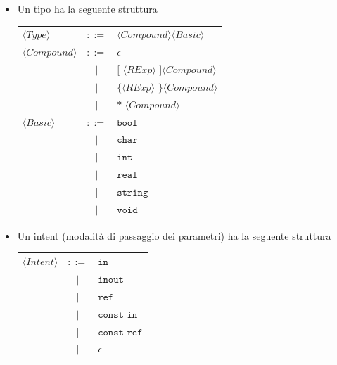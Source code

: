 \documentclass{report}
\newcommand{\nonterm}[1]{\langle #1 \rangle}
\newcommand{\term}[1]{\texttt{#1}}
\begin{document}
\begin{itemize}
    \item Un tipo ha la seguente struttura
        \begin{center}
        \begin{tabular}{l c l}
        $\nonterm{Type}$        &   $::=$   &   $\nonterm{Compound} \nonterm{Basic}$                        \\
        $\nonterm{Compound}$    &   $::=$   &   $\epsilon$                                                  \\
                                &    $|$    &   $\term{[ } \nonterm{RExp} \term{ ]} \nonterm{Compound}$     \\
                                &    $|$    &   $\term{\{ } \nonterm{RExp} \term{ \}} \nonterm{Compound}$   \\
                                &    $|$    &   $\term{* } \nonterm{Compound}$                              \\
        $\nonterm{Basic}$       &   $::=$   &   $\term{bool}$                                               \\
                                &    $|$    &   $\term{char}$                                               \\
                                &    $|$    &   $\term{int}$                                                \\
                                &    $|$    &   $\term{real}$                                               \\
                                &    $|$    &   $\term{string}$                                             \\
                                &    $|$    &   $\term{void}$

        \end{tabular}
        \end{center}

    \item Un intent (modalità di passaggio dei parametri) ha la seguente struttura
        \begin{flushleft}
        \begin{tabular}{ l c l }
        $\nonterm{Intent}$      &   $::=$   &   $\term{in}$                                             \\
                                &    $|$    &   $\term{inout}$                                          \\
                                &    $|$    &   $\term{ref}$                                            \\
                                &    $|$    &   $\term{const in}$                                       \\
                                &    $|$    &   $\term{const ref}$                                      \\
                                &    $|$    &   $\epsilon$


\end{tabular}
\end{flushleft}
\end{itemize}
\end{document}
